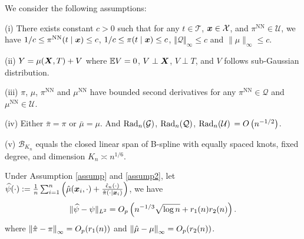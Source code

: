 \begin{assump}\label{assump2} We consider the following assumptions:

(i) There exists constant $c>0$ such that for any $t\in\mathcal{T}$, $\boldsymbol{x}\in\mathcal{X}$, and $\pi^{\text{NN}}\in\mathcal{U}$, we have $1/c\le\pi^{\text{NN}}(t\mid\boldsymbol{x})\le c$, $1/c\le\pi(t\mid\boldsymbol{x})\le c$, $\left\Vert \mathcal{Q}\right\Vert _{\infty}\le c$ and $\|\mu\|_{\infty}\leq c$.

(ii) $Y=\mu(\boldsymbol{X},T)+V$ where $\mathbb{E} V=0$, $V\perp\boldsymbol{X}$, $V\perp T$, and $V$ follows sub-Gaussian distribution.

(iii)  $\pi$, $\mu$, $\pi^{\text{NN}}$ and $\mu^{\text{NN}}$ have bounded second derivatives for any $\pi^{\text{NN}} \in \mathcal{Q}$ and $\mu^{\text{NN}} \in \mathcal{U}$.

(iv) %
Either $\bar\pi=\pi$ or $\bar \mu=\mu$. And $\text{Rad}_n(\mathcal{G})$, $\text{Rad}_n(\mathcal{Q})$, $\text{Rad}_n(\mathcal{U})$ $=O\left(n^{-1/2}\right)$.

(v) $\mathcal{B}_{K_n}$ equals the closed linear span of B-spline with equally spaced knots, fixed degree, and dimension $K_n\asymp n^{1/6}$.
\end{assump} 

\begin{thm}\label{thm:Gamma_consistency_spline}
Under Assumption \ref{assump} and \ref{assump2},
let $\widehat{\psi}({\cdot}):=\frac{1}{n}\sum_{i=1}^{n}\left(\hat \mu(\boldsymbol{x}_i,\cdot)+ \frac{\hat\epsilon_n(\cdot)}{\hat\pi(\cdot\mid\boldsymbol{x}_i)}\right)$, we have
\[
\|\widehat{\psi}-\psi\|_{L^2}=O_{p}\left(n^{-1/3}\sqrt{\log n}+r_1(n)r_2(n)\right).
\]
where
$\left\Vert \hat{\pi}-\pi\right\Vert _{\infty}=O_{p}(r_{1}(n))$ and $\left\Vert \hat{\mu}-\mu\right\Vert _{\infty}=O_{p}(r_{2}(n))$.
\end{thm}

